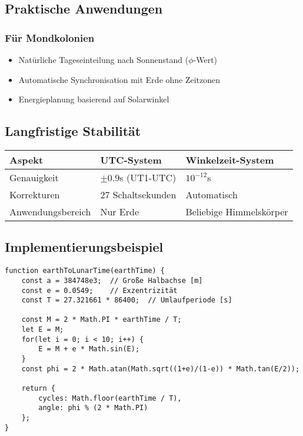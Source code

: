 \subsection{Praktische Anwendungen}
\subsubsection{Für Mondkolonien}
\begin{itemize}
    \item Natürliche Tageseinteilung nach Sonnenstand ($\phi$-Wert)
    \item Automatische Synchronisation mit Erde ohne Zeitzonen
    \item Energieplanung basierend auf Solarwinkel
\end{itemize}

\subsection{Langfristige Stabilität}
\begin{tabular}{lll}
    \hline
    Aspekt & UTC-System & Winkelzeit-System \\
    \hline
    Genauigkeit & $\pm0.9$s (UT1-UTC) & $10^{-12}$s \\
    Korrekturen & 27 Schaltsekunden & Automatisch \\
    Anwendungsbereich & Nur Erde & Beliebige Himmelskörper \\
    \hline
\end{tabular}

\subsection{Implementierungsbeispiel}
\begin{verbatim}
function earthToLunarTime(earthTime) {
    const a = 384748e3;  // Große Halbachse [m]
    const e = 0.0549;    // Exzentrizität
    const T = 27.321661 * 86400;  // Umlaufperiode [s]
    
    const M = 2 * Math.PI * earthTime / T;
    let E = M;
    for(let i = 0; i < 10; i++) {
        E = M + e * Math.sin(E);
    }
    const phi = 2 * Math.atan(Math.sqrt((1+e)/(1-e)) * Math.tan(E/2));
    
    return {
        cycles: Math.floor(earthTime / T),
        angle: phi % (2 * Math.PI)
    };
}
\end{verbatim}